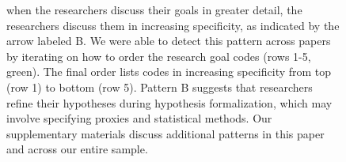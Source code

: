{\begin{figure}
\begin{small}
\begin{minipage}{\linewidth}
            when the researchers discuss their goals in greater detail, the
            researchers discuss them in increasing specificity, as indicated by
            the arrow labeled B. We were able to detect this pattern across
            papers by iterating on how to order the research goal codes (rows
            1-5, green). The final order lists codes in increasing specificity
            from top (row 1) to bottom (row 5). Pattern B suggests that
            researchers refine their hypotheses during hypothesis formalization,
            which may involve specifying proxies and statistical methods.
            Our supplementary materials discuss additional patterns in this paper
            and across our entire sample. 
            \end{minipage}
        \end{small}
    \end{figure}
}